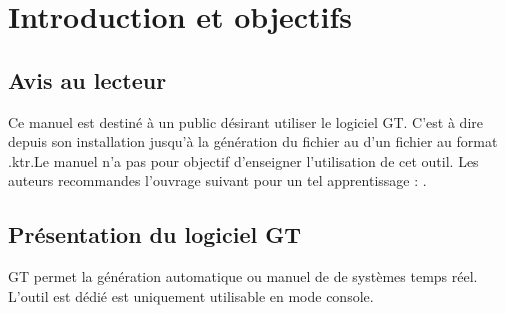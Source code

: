 \section{Introduction et objectifs}
\label{chap:fichDonnees}
\subsection{Avis au lecteur} 
Ce manuel est destiné à un public désirant utiliser le logiciel GT. C'est à dire depuis son installation jusqu'à la génération du fichier au d'un fichier au format .ktr.Le manuel n'a pas pour objectif d'enseigner l'utilisation de cet outil. Les auteurs recommandes l'ouvrage suivant pour un tel apprentissage : \cite{kiwi}.

\subsection{Présentation du logiciel GT}
GT permet la génération automatique ou manuel de de systèmes temps réel.  L'outil est dédié est uniquement utilisable en mode console.
